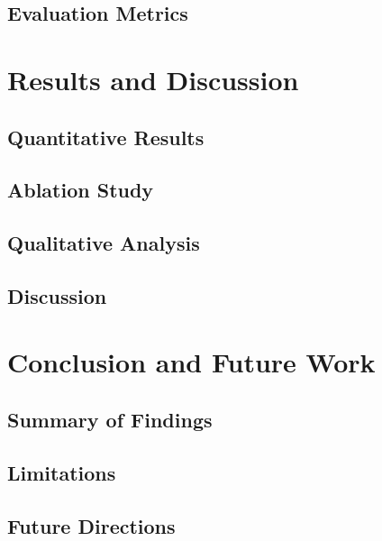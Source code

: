 \documentclass[sigconf]{acmart}
\begin{document}
\subsection{Evaluation Metrics}

\section{Results and Discussion}
\subsection{Quantitative Results}
\subsection{Ablation Study}
\subsection{Qualitative Analysis}
\subsection{Discussion}

\section{Conclusion and Future Work}
\label{sec:conclusion}
\subsection{Summary of Findings}
\subsection{Limitations}
\subsection{Future Directions}

\begin{acks}
\end{acks}



\end{document}
